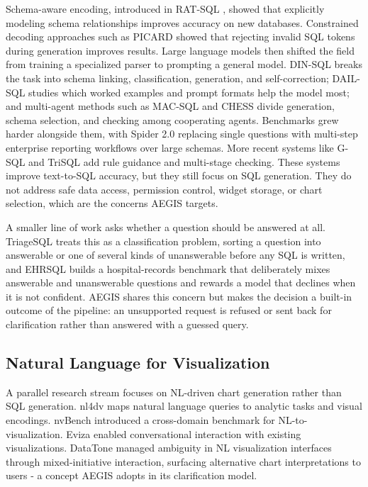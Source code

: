\documentclass[pdflatex,sn-mathphys-num]{sn-jnl}
\begin{document}
Schema-aware encoding, introduced in RAT-SQL \citep{wang2020ratsql}, showed that explicitly modeling schema relationships improves accuracy on new databases. Constrained decoding approaches such as PICARD \citep{scholak2021picard} showed that rejecting invalid SQL tokens during generation improves results. Large language models then shifted the field from training a specialized parser to prompting a general model. DIN-SQL \citep{pourreza2023dinsql} breaks the task into schema linking, classification, generation, and self-correction; DAIL-SQL \citep{gao2024dailsql} studies which worked examples and prompt formats help the model most; and multi-agent methods such as MAC-SQL \citep{wang2025macsql} and CHESS \citep{talaei2024chess} divide generation, schema selection, and checking among cooperating agents. Benchmarks grew harder alongside them, with Spider 2.0 \citep{lei2025spider2} replacing single questions with multi-step enterprise reporting workflows over large schemas. More recent systems like G-SQL \citep{shalaan2025gsql} and TriSQL \citep{su2026robust} add rule guidance and multi-stage checking. These systems improve text-to-SQL accuracy, but they still focus on SQL generation. They do not address safe data access, permission control, widget storage, or chart selection, which are the concerns AEGIS targets.


A smaller line of work asks whether a question should be answered at all. TriageSQL \citep{zhang2020triagesql} treats this as a classification problem, sorting a question into answerable or one of several kinds of unanswerable before any SQL is written, and EHRSQL \citep{lee2022ehrsql} builds a hospital-records benchmark that deliberately mixes answerable and unanswerable questions and rewards a model that declines when it is not confident. AEGIS shares this concern but makes the decision a built-in outcome of the pipeline: an unsupported request is refused or sent back for clarification rather than answered with a guessed query.


\subsection{Natural Language for Visualization}

A parallel research stream focuses on NL-driven chart generation rather than SQL generation. nl4dv \citep{narechania2021nl4dv} maps natural language queries to analytic tasks and visual encodings. nvBench \citep{luo2021nl2vis} introduced a cross-domain benchmark for NL-to-visualization. Eviza \citep{setlur2016eviza} enabled conversational interaction with existing visualizations. DataTone \citep{gao2015datatone} managed ambiguity in NL visualization interfaces through mixed-initiative interaction, surfacing alternative chart interpretations to users - a concept AEGIS adopts in its clarification model.
\end{document}
